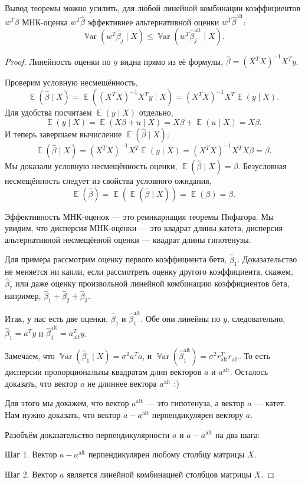 \documentclass[12pt]{article}
\DeclareMathOperator{\Var}{\mathbb{V}ar}
\DeclareMathOperator{\E}{\mathbb{E}}
\newcommand{\hb}{\hat{\beta}}
\newcommand{\alt}{\text{alt}}
\begin{document}
Вывод теоремы можно усилить, для любой линейной комбинации коэффициентов $w^T \beta$ МНК-оценка $w^T \hb$ эффективнее альтернативной оценки $w^T \hb^{\alt}$:
\[
\Var(w^T\hb_j \mid X) \leq \Var(w^T \hb^{\alt}_j \mid X).
\]

\begin{proof}
Линейность оценки по $y$ видна прямо из её формулы, $\hb = (X^TX)^{-1}X^Ty$.

Проверим условную несмещённость, 
\[
\E(\hb \mid X) = \E((X^TX)^{-1}X^Ty \mid X) = (X^TX)^{-1}X^T\E(y \mid X).
\]
Для удобства посчитаем $\E(y \mid X)$ отдельно,
\[
\E(y \mid X) = \E(X\beta + u \mid X) = X\beta + \E(u \mid X) = X\beta.
\]
И теперь завершаем вычисление $\E(\hb \mid X)$:
\[
\E(\hb \mid X) = (X^TX)^{-1}X^T\E(y \mid X) = (X^TX)^{-1}X^TX\beta = \beta.
\]
Мы доказали условную несмещённость оценки, $\E(\hb \mid X) = \beta$.
Безусловная несмещённость следует из свойства условного ожидания,
\[
\E(\hb) = \E(\E(\hb \mid X)) = \E(\beta) = \beta.
\]

Эффективность МНК-оценок — это реинкарнация теоремы Пифагора. 
Мы увидим, что дисперсия МНК-оценки — это квадрат длины катета, 
дисперсия альтернативной несмещённой оценки — квадрат длины гипотенузы.

Для примера рассмотрим оценку первого коэффициента бета, $\hb_1$.
Доказательство не меняется ни капли, если рассмотреть оценку другого коэффициента, скажем, $\hb_7$ или даже оценку произвольной линейной комбинацию коэффициентов бета, например, $\hb_1 + \hb_2 + \hb_3$.

Итак, у нас есть две оценки, $\hb_1$ и $\hb_1^{\alt}$. 
Обе они линейны по $y$, следовательно, $\hb_1 = a^T y$ и $\hb_1^{\alt} = a^T_{\alt} y$.


Замечаем, что $\Var(\hb_1 \mid X) = \sigma^2 a^Ta$, и $\Var(\hb_1^{\alt}) = \sigma^2 r_{\alt}^Tr_{\alt}$. 
То есть дисперсии пропорциональны квадратам длин векторов $a$ и $a^{\alt}$. 
Осталось доказать, что вектор $a$ не длиннее вектора $a^{\alt}$ :)

Для этого мы докажем, что вектор $a^{\alt}$ — это гипотенуза, а вектор $a$ — катет. 
Нам нужно доказать, что вектор $a - a^{\alt}$ перпендикулярен вектору $a$.

Разобъём доказательство перпендикулярности $a$ и $a-a^{\alt}$ на два шага:

Шаг 1. Вектор $a - a^{\alt}$ перпендикулярен любому столбцу матрицы $X$.

Шаг 2. Вектор $a$ является линейной комбинацией столбцов матрицы $X$.



\end{proof}
\end{document}
